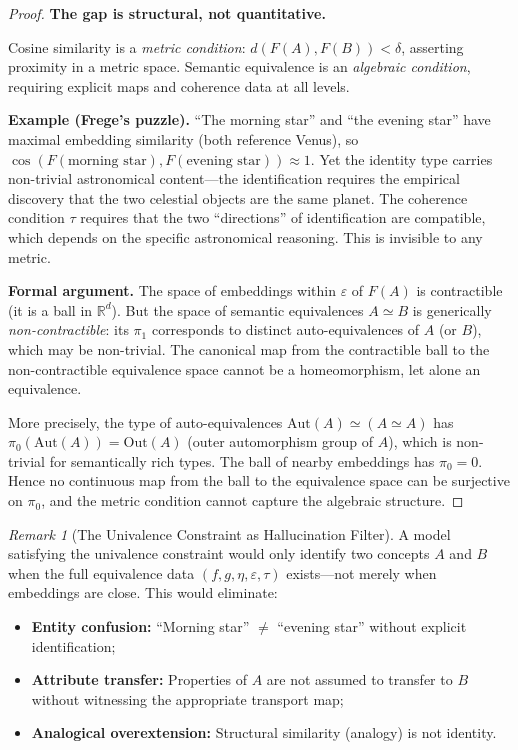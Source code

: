 \documentclass[11pt,a4paper]{article}
\theoremstyle{plain}
\theoremstyle{definition}
\theoremstyle{remark}
\newtheorem{remark}[theorem]{Remark}
\newcommand{\R}{\mathbb{R}}
\begin{document}
\begin{proof}
\textbf{The gap is structural, not quantitative.}

Cosine similarity is a \emph{metric condition}: $d(F(A), F(B)) < \delta$, asserting proximity in a metric space. Semantic equivalence is an \emph{algebraic condition}, requiring explicit maps and coherence data at all levels.

\textbf{Example (Frege's puzzle).} ``The morning star'' and ``the evening star'' have maximal embedding similarity (both reference Venus), so $\cos(F(\text{morning star}), F(\text{evening star})) \approx 1$. Yet the identity type carries non-trivial astronomical content---the identification requires the empirical discovery that the two celestial objects are the same planet. The coherence condition $\tau$ requires that the two ``directions'' of identification are compatible, which depends on the specific astronomical reasoning. This is invisible to any metric.

\textbf{Formal argument.} The space of embeddings within $\varepsilon$ of $F(A)$ is contractible (it is a ball in $\R^d$). But the space of semantic equivalences $A \simeq B$ is generically \emph{non-contractible}: its $\pi_1$ corresponds to distinct auto-equivalences of $A$ (or $B$), which may be non-trivial. The canonical map from the contractible ball to the non-contractible equivalence space cannot be a homeomorphism, let alone an equivalence.

More precisely, the type of auto-equivalences $\mathrm{Aut}(A) \simeq (A \simeq A)$ has $\pi_0(\mathrm{Aut}(A)) = \mathrm{Out}(A)$ (outer automorphism group of $A$), which is non-trivial for semantically rich types. The ball of nearby embeddings has $\pi_0 = 0$. Hence no continuous map from the ball to the equivalence space can be surjective on $\pi_0$, and the metric condition cannot capture the algebraic structure.
\end{proof}

\begin{remark}[The Univalence Constraint as Hallucination Filter]
\label{rem:univalence-filter}
A model satisfying the univalence constraint would only identify two concepts $A$ and $B$ when the full equivalence data $(f, g, \eta, \varepsilon, \tau)$ exists---not merely when embeddings are close. This would eliminate:
\begin{itemize}[nosep]
  \item \textbf{Entity confusion:} ``Morning star'' $\neq$ ``evening star'' without explicit identification;
  \item \textbf{Attribute transfer:} Properties of $A$ are not assumed to transfer to $B$ without witnessing the appropriate transport map;
  \item \textbf{Analogical overextension:} Structural similarity (analogy) is not identity.
\end{itemize}
\end{remark}
\end{document}
